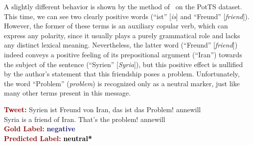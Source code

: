 A slightly different behavior is shown by the method
of~\citet{Severyn:15} on the PotTS dataset.  This time, we can see two
clearly positive words (``ist'' [\emph{is}] and ``Freund''
[\emph{friend}]).  However, the former of these terms is an auxiliary
copular verb, which can express any polarity, since it usually plays a
purely grammatical role and lacks any distinct lexical meaning.
Nevertheless, the latter word (``Freund'' [\emph{friend}]) indeed
conveys a positive feeling of its prepositional argument (``Iran'')
towards the subject of the sentence (``Syrien'' [\emph{Syria}]), but
this positive effect is nullified by the author's statement that this
friendship poses a problem. Unfortunately, the word ``Problem''
(\emph{problem}) is recognized only as a neutral marker, just like
many other terms present in this message.

\begin{example}\label{snt:cgsa:exmp:severyn-error}
  \noindent\textup{\bfseries\textcolor{darkred}{Tweet:}} {\upshape
    \colorbox{white!7.4}{Syrien} \colorbox{green!8}{ist}
    \colorbox{green!11}{Freund} \colorbox{white!6.6}{von}
    \colorbox{white!40.5}{Iran}, das \colorbox{green!8}{ist}
    \colorbox{white!12.7}{das}
    \colorbox{green!1.5}{Problem}\colorbox{green!3}{!}
    \colorbox{blue!0.000005!white!8}{annewill}}\\
  \noindent \colorbox{white!7.4}{Syria} \colorbox{green!8}{is} a \colorbox{green!11}{friend} \colorbox{white!6.6}{of} \colorbox{white!40.5}{Iran}. That\colorbox{green!8}{'s} \colorbox{white!12.7}{the} \colorbox{green!1.5}{problem}\colorbox{green!3}{!} \colorbox{blue!0.000005!white!8}{annewill}\\[\exampleSep]
  \noindent\textup{\bfseries\textcolor{darkred}{Gold Label:}}\hspace*{4.3em}\textbf{%
    \upshape\textcolor{midnightblue}{negative}}\\
 \noindent\textup{\bfseries\textcolor{darkred}{Predicted Label:}}\hspace*{2em}\textbf{%
    \upshape\textcolor{black}{neutral*}}
\end{example}

